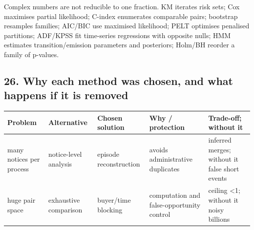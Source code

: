 Complex numbers are not reducible to one fraction. KM iterates risk
sets; Cox maximises partial likelihood; C-index enumerates comparable
pairs; bootstrap resamples families; AIC/BIC use maximised likelihood;
PELT optimises penalised partitions; ADF/KPSS fit time-series
regressions with opposite nulls; HMM estimates transition/emission
parameters and posteriors; Holm/BH reorder a family of p-values.

\subsection{26. Why each method was chosen, and what happens if it is
removed}\label{26-why-each-method-was-chosen-and-what-happens-if-it-is-removed}

{\def\LTcaptype{none} %
\begin{longtable}[]{@{}
  >{\raggedright\arraybackslash}p{}
  >{\raggedright\arraybackslash}p{}
  >{\raggedright\arraybackslash}p{}
  >{\raggedright\arraybackslash}p{}
  >{\raggedright\arraybackslash}p{}@{}}
\toprule\noalign{}
\begin{minipage}[b]{\linewidth}\raggedright
Problem
\end{minipage} & \begin{minipage}[b]{\linewidth}\raggedright
Alternative
\end{minipage} & \begin{minipage}[b]{\linewidth}\raggedright
Chosen solution
\end{minipage} & \begin{minipage}[b]{\linewidth}\raggedright
Why / protection
\end{minipage} & \begin{minipage}[b]{\linewidth}\raggedright
Trade-off; without it
\end{minipage} \\
\midrule\noalign{}
\endhead
\bottomrule\noalign{}
\endlastfoot
many notices per process & notice-level analysis & episode
reconstruction & avoids administrative duplicates & inferred merges;
without it false short events \\
huge pair space & exhaustive comparison & buyer/time blocking &
computation and false-opportunity control & ceiling \textless1; without
it noisy billions \\

\end{longtable}}

